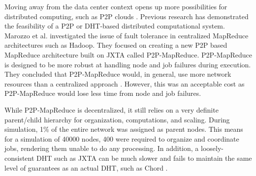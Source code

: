 \documentclass[10pt,conference]{IEEEtran}
\begin{document}
Moving away from the data center context opens up more possibilities for distributed computing, such as P2P clouds \cite{p2p-cloud}.
Previous research has demonstrated the feasibility of a P2P or DHT-based distributed computational system.
Marozzo et al. \cite{marozzo2012p2p} investigated the issue of fault tolerance in centralized MapReduce architectures such as Hadoop.  
They focused on creating a new P2P based MapReduce architecture built on JXTA \cite{jxta} called P2P-MapReduce.  
P2P-MapReduce is designed to be more robust at handling node and job failures during execution.
%
They concluded that P2P-MapReduce would, in general, use more network resources than a centralized approach \cite{marozzo2012p2p}. 
However, this was an acceptable cost as P2P-MapReduce would lose less time from node and job failures.

While P2P-MapReduce is decentralized, it still relies on a very definite parent/child hierarchy for organization, computations, and scaling. 
During simulation, 1\% of the entire network was assigned as parent nodes. This means for a simulation of 40000 nodes, 400 were required to organize and coordinate jobs, rendering them unable to do any processing.  
In addition, a loosely-consistent DHT such as JXTA can be much slower and fails to maintain the same level of guarantees as an actual DHT, such as Chord \cite{5359174}.   
%
\end{document}
